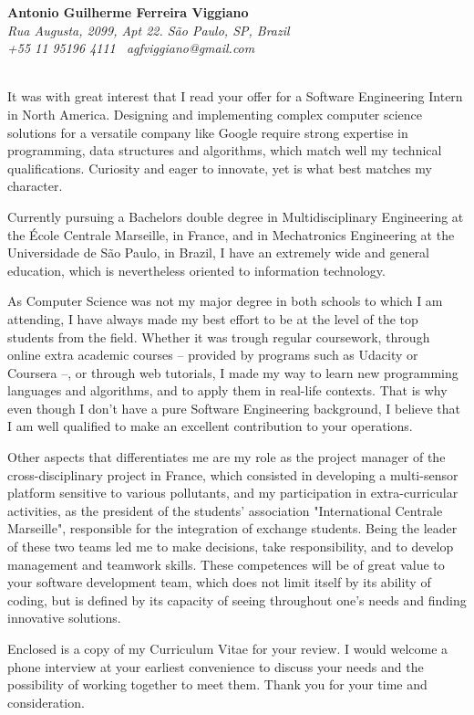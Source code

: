 \documentclass[11pt]{article}
\begin{document}
\sffamily %
\hfill%
\begin{minipage}[t]{.6\textwidth}
\raggedleft%
{\bfseries Antonio Guilherme Ferreira Viggiano}\\[.35ex]
\small
\emph{Rua Augusta, 2099, Apt 22. São Paulo, SP, Brazil \\
+55 11 95196 4111 \textemdash~agfviggiano@gmail.com}
\end{minipage}\\[1em]

It was with great interest that I read your offer for a Software Engineering Intern in North America. Designing and implementing complex computer science solutions for a versatile company like Google require strong expertise in programming, data structures and algorithms, which match well my technical qualifications. Curiosity and eager to innovate, yet is what best matches my character. \vspace{0.75em}

Currently pursuing a Bachelors double degree in Multidisciplinary Engineering at the École Centrale Marseille, in France, and in Mechatronics Engineering at the Universidade de São Paulo, in Brazil, I have an extremely wide and general education, which is nevertheless oriented to information technology. \vspace{0.75em}

As Computer Science was not my major degree in both schools to which I am attending, I have always made my best effort to be at the level of the top students from the field. Whether it was trough regular coursework, through online extra academic courses -- provided by programs such as Udacity or Coursera --, or through web tutorials, I made my way to learn new programming languages and algorithms, and to apply them in real-life contexts. That is why even though I don't have a pure Software Engineering background, I believe that I am well qualified to make an excellent contribution to your operations. \vspace{0.75em}

Other aspects that differentiates me are my role as the project manager of the cross-disciplinary project in France, which consisted in developing a multi-sensor platform sensitive to various pollutants, and my participation in extra-curricular activities, as the president of the students' association "International Centrale Marseille", responsible for the integration of exchange students. Being the leader of these two teams led me to make decisions, take responsibility, and to develop management and teamwork skills. These competences will be of great value to your software development team, which does not limit itself by its ability of coding, but is defined by its capacity of seeing throughout one's needs and finding innovative solutions. \vspace{0.75em}

Enclosed is a copy of my Curriculum Vitae for your review. I would welcome a phone interview at your earliest convenience to discuss your needs and the possibility of working together to meet them. Thank you for your time and consideration. \vspace{0.75em}
\end{document}
